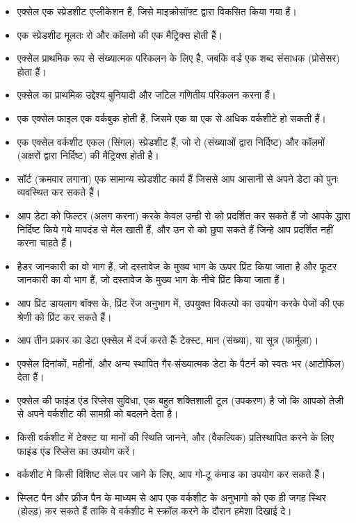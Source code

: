 \begin{itemize}[topsep=-1ex,parsep=0ex,partopsep=0ex,itemsep=0.4ex]
\item एक्सेल एक स्प्रेडशीट एप्लीकेशन हैं, जिसे माइक्रोसॉफ्ट द्वारा विकसित किया गया हैं।
\item एक स्प्रेडशीट मूलतः रो और कॉलमो की एक मैट्रिक्स होती हैं।
\item एक्सेल प्राथमिक रूप से संख्यात्मक परिकलन के लिए है, जबकि वर्ड एक शब्द संसाधक (प्रोसेसर) होता हैं।
\item एक्सेल का प्राथमिक उद्देश्य बुनियादी और जटिल गणितीय परिकलन करना हैं।
\item एक एक्सेल फाइल एक वर्कबुक होती हैं, जिसमे एक या एक से अधिक वर्कशीटे हो सकती हैं।
\item एक एक्सेल वर्कशीट एकल (सिंगल) स्प्रेडशीट हैं, जो रो (संख्याओं द्वारा निर्दिष्ट) और कॉलमों (अक्षरों द्वारा निर्दिष्ट) की मैट्रिक्स होती है।
\item सॉर्ट (क्रमवार लगाना) एक सामान्य स्प्रेडशीट कार्य हैं जिससे आप आसानी से अपने डेटा को पुनः व्यवस्थित कर सकते हैं।
\item आप डेटा को फिल्टर (अलग करना) करके केवल उन्ही रो को प्रदर्शित कर सकते हैं जो आपके द्धारा निर्दिष्ट किये गये मापदंड से मेल खाती हैं, और उन रो को छुपा सकते हैं जिन्हे आप प्रदर्शित नहीं करना चाहते हैं।
\item हैडर जानकारी का वो भाग हैं, जो दस्तावेज के मुख्य भाग के ऊपर प्रिंट किया जाता है और फूटर जानकारी का वो भाग हैं, जो दस्तावेज के मुख्य भाग के नीचे प्रिंट किया जाता हैं।
\item आप प्रिंट डायलाग बॉक्स के, प्रिंट रेंज अनुभाग में, उपयुक्त विकल्पो का उपयोग करके पेजों की एक श्रेणी को प्रिंट कर सकते हैं।
\item आप तीन प्रकार का डेटा एक्सेल में दर्ज करते हैंः टेक्स्ट, मान (संख्या), या सूत्र (फार्मूला)।
\item एक्सेल दिनांकों, महीनों, और अन्य स्थापित गैर-संख्यात्मक डेटा के पैटर्न को स्वतः भर (आटोफिल) देता हैं।
\item एक्सेल की फाइंड एंड रिप्लेस सुविधा, एक बहुत शक्तिशाली टूल (उपकरण) है जो कि आपको तेजी से अपने वर्कशीट की सामग्री को बदलने देता है।
\item किसी वर्कशीट में टेक्स्ट या मानों की स्थिति जानने, और (वैकल्पिक) प्रतिस्थापित करने के लिए फाइंड एंड रिप्लेस का उपयोग करें।
\item वर्कशीट मे किसी विशिष्ट सेल पर जाने के लिए, आप गो-टू कंमाड का उपयोग कर सकते हैं।
\item स्प्लिट पैन और फ्रीज पैन के माध्यम से आप एक वर्कशीट के अनुभागो को एक ही जगह स्थिर (होल्ड़) कर सकते हैं ताकि वे वर्कशीट मे स्क्रॉल करने के दौरान हमेशा दिखाई दे।
\end{itemize}

